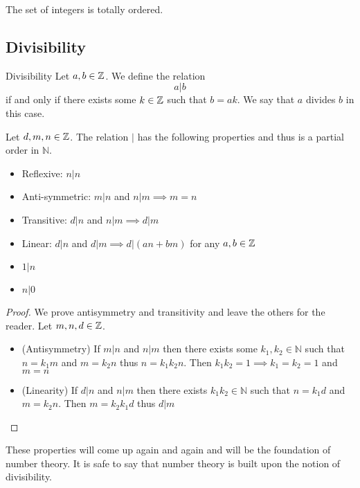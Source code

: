 \documentclass[a4paper]{article}
\begin{document}
\begin{prp}{}{} The set of integers is totally ordered. 
\end{prp}

\subsection{Divisibility}
\begin{defn}{Divisibility}{} Let $a,b\in\mathbb{Z}$. We define the relation $$a|b$$ if and only if there exists some $k\in\mathbb{Z}$ such that $b=ak$. We say that $a$ divides $b$ in this case. 
\end{defn}

\begin{prp}{}{} Let $d,m,n\in\mathbb{Z}$. The relation $|$ has the following properties and thus is a partial order in $\mathbb{N}$. 
\begin{itemize}
\item Reflexive: $n|n$
\item Anti-symmetric: $m|n$ and $n|m\implies m=n$
\item Transitive: $d|n$ and $n|m\implies d|m$
\item Linear: $d|n$ and $d|m\implies d|(an+bm)$ for any $a,b\in\mathbb{Z}$
\item $1|n$
\item $n|0$
\end{itemize} \tcbline
\begin{proof} We prove antisymmetry and transitivity and leave the others for the reader. Let $m,n,d\in\mathbb{Z}$. 
\begin{itemize}
\item (Antisymmetry) If $m|n$ and $n|m$ then there exists some $k_1,k_2\in\mathbb{N}$ such that $n=k_1m$ and $m=k_2n$ thus $n=k_1k_2n$. Then $k_1k_2=1\implies k_1=k_2=1$ and $m=n$
\item (Linearity) If $d|n$ and $n|m$ then there exists $k_1k_2\in\mathbb{N}$ such that $n=k_1d$ and $m=k_2n$. Then $m=k_2k_1d$ thus $d|m$
\end{itemize}
\end{proof}
\end{prp}

These properties will come up again and again and will be the foundation of number theory. It is safe to say that number theory is built upon the notion of divisibility. 
\end{document}

